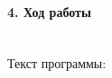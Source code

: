 \documentclass[12pt,a4paper]{report}
\begin{document}
\paragraph{4. Ход работы \\\\}
Текст программы:\\

\begin{figure}[h!]
\end{figure}
\begin{figure}[h!]
\end{figure}
\begin{figure}[h!]
\end{figure}
\begin{figure}[h!]
\end{figure}
\newpage
\end{document}
